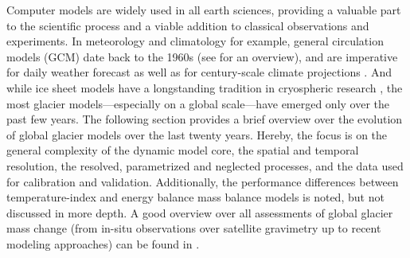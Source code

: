 
    Computer models are widely used in all earth sciences, providing a valuable part to the scientific process and a viable addition to classical observations and experiments. In meteorology and climatology for example, general circulation models (GCM) date back to the 1960s (see \citet{Williamson2007} for an overview), and are imperative for daily weather forecast as well as for century-scale climate projections \citep[e.g.,][]{Cote2015, Lauritzen2011}. And while ice sheet models have a longstanding tradition in cryospheric research \citep[e.g.,][]{Pattyn2012, Nowicki2016}, the most glacier models---especially on a global scale---have emerged only over the past few years.
    The following section provides a brief overview over the evolution of global glacier models over the last twenty years. Hereby, the focus is on the general complexity of the dynamic model core, the spatial and temporal resolution, the resolved, parametrized and neglected processes, and the data used for calibration and validation. Additionally, the performance differences between temperature-index and energy balance mass balance models is noted, but not discussed in more depth. A good overview over all assessments of global glacier mass change (from in-situ observations over satellite gravimetry up to recent modeling approaches) can be found in \citet{Radic2014}.

